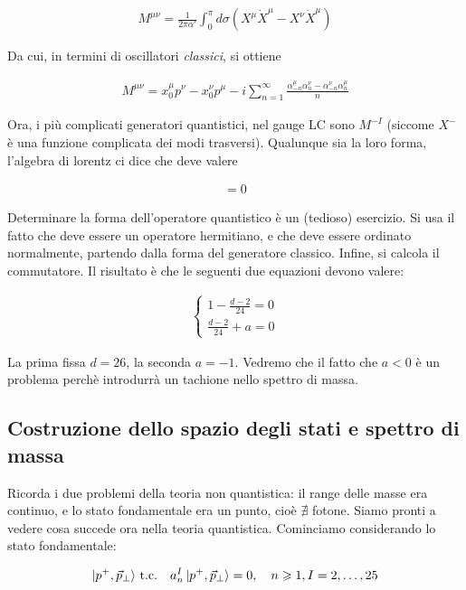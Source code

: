 \documentclass{report}
\begin{document}
\begin{align}
    M^{\mu\nu} = \frac{1}{2\pi\alpha'}\int_0^\pi d\sigma (X^\mu \dot{X}^\mu - X^\nu \dot{X}^\mu)
\end{align}

Da cui, in termini di oscillatori \emph{classici}, si ottiene

\begin{align}
    M^{\mu\nu} = x_0^\mu p^\nu - x_0^\nu p^\mu -i\sum_{n=1}^\infty \frac{\alpha^\mu_{-n}\alpha^\nu_n - \alpha_{-n}^\nu \alpha^\mu_n}{n}
\end{align}

Ora, i più complicati generatori quantistici, nel gauge LC sono \(M^{-I}\) (siccome \(X^-\) è una funzione complicata dei modi trasversi). Qualunque sia la loro forma, l'algebra di lorentz ci dice che deve valere 

\begin{align}
    [M^{-I}, M^{-J}] = 0
\end{align}

Determinare la forma dell'operatore quantistico è un (tedioso) esercizio. Si usa il fatto che deve essere un operatore hermitiano, e che deve essere ordinato normalmente, partendo dalla forma del generatore classico. Infine, si calcola il commutatore. Il risultato è che le seguenti due equazioni devono valere: 

\begin{align}
    \begin{cases}
        1 - \frac{d-2}{24} = 0 \\ \frac{d-2}{24} + a = 0 
    \end{cases}
\end{align}

La prima fissa \(d = 26\), la seconda \(a = -1\). Vedremo che il fatto che \(a<0\) è un problema perchè introdurrà un tachione nello spettro di massa. 


\subsection{Costruzione dello spazio degli stati e spettro di massa}

Ricorda i due problemi della teoria non quantistica: il range delle masse era continuo, e lo stato fondamentale era un punto, cioè \(\nexists\) fotone. Siamo pronti a vedere cosa succede ora nella teoria quantistica. Cominciamo considerando lo stato fondamentale: 

\begin{align}
    \ket{p^+, \vec{p}_\perp} \, \text{t.c.} \quad a_n^I \ket{p^+, \vec{p}_\perp} = 0, \quad n\geqslant 1, I = 2, \ldots, 25
\end{align}
\end{document}
